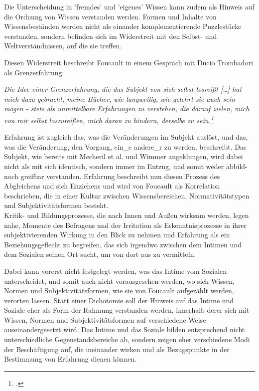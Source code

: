 Die Unterscheidung in 'fremdes' und 'eigenes' 
Wissen kann zudem als Hinweis auf die Ordnung von Wissen verstanden werden. Formen und Inhalte von Wissensbeständen werden nicht als einander komplementierende Puzzlestücke verstanden, sondern befinden sich im Widerstreit mit den Selbst- und Weltverständnissen, auf die sie treffen.

Diesen Widerstreit beschreibt Foucault in einem Gespräch mit Ducio Trombadori als Grenzerfahrung:

\begin{myenv}
  \textit{\glqq Die Idee einer Grenzerfahrung, die das Subjekt von sich selbst
  losreißt […] hat mich dazu gebracht, meine Bücher, wie langweilig, wie
gelehrt sie auch sein mögen - stets als unmittelbare Erfahrungen zu verstehen,
die darauf zielen, mich von mir selbst loszureißen, mich daran zu hindern,
derselbe zu sein.\grqq\footnotemark \footcitetext{foucinterview}} 
\end{myenv} 

Erfahrung ist zugleich das, was die Veränderungen im Subjekt
auslöst, und das, was die Veränderung, den Vorgang, ein\_e andere\_r zu werden,
beschreibt. Das Subjekt, wie bereits mit Mecheril et al. und Wimmer
angeklungen, wird dabei nicht als mit sich identisch, sondern immer im Entzug,
und somit weder abbild- noch greifbar verstanden. Erfahrung beschreibt nun
diesen Prozess des Abgleichens und sich Enziehens und wird von Foucault als
Korrelation beschrieben, die \glqq in einer Kultur zwischen Wissensbereichen,
Normativitätstypen und Subjektivitätsformen\grqq\footnotemark
{} besteht. 
\\

Kritik- und
Bildungsprozesse, die nach Innen und Außen wirksam werden, legen nahe, Momente
des Befragens und der Irritation als Erkenntnisprozesse in ihrer
subjektivierenden Wirkung in den Blick zu nehmen und Erfahrung als ein
Beziehungsgeflecht zu begreifen, das sich irgendwo zwischen dem Intimen und dem
Sozialen seinen Ort sucht, um von dort aus zu vermitteln.

Dabei kann vorerst
nicht festgelegt werden, was das Intime vom Sozialen unterscheidet, und somit
auch nicht vorausgesehen werden, wo sich Wissen, Normen und
Subjektivitätsformen, wie sie von Foucault aufgezählt werden, verorten lassen.
Statt einer Dichotomie soll der Hinweis auf das Intime und Soziale eher als
Form der Rahmung verstanden werden, innerhalb derer sich mit Wissen, Normen und
Subjektivitätsformen auf verschiedene Weise auseinandergesetzt wird. Das Intime
und das Soziale bilden entsprechend nicht unterschiedliche Gegenstandsbereiche
ab, sondern zeigen eher verschiedene Modi der Beschäftigung auf, die ineinander
wirken und als Bezugspunkte in der Bestimmung von Erfahrung dienen können. 
 \\
 
